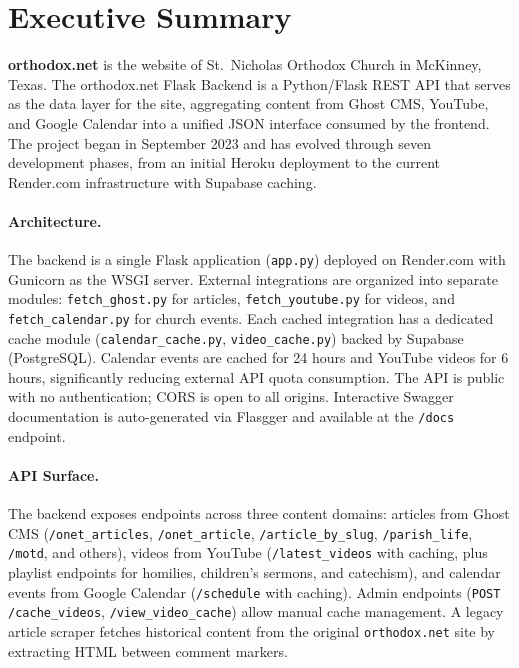 \documentclass[12pt]{article}
\begin{document}
\section{Executive Summary}
{\setlength{\parskip}{0pt}\setlength{\parfillskip}{0pt plus 1fil}%
%

\textbf{orthodox.net} is the website of St.\ Nicholas Orthodox Church in McKinney, Texas. The orthodox.net Flask Backend is a Python/Flask REST API that serves as the data layer for the site, aggregating content from Ghost CMS, YouTube, and Google Calendar into a unified JSON interface consumed by the frontend. The project began in September 2023 and has evolved through seven development phases, from an initial Heroku deployment to the current Render.com infrastructure with Supabase caching.

\paragraph{Architecture.} The backend is a single Flask application (\texttt{app.py}) deployed on Render.com with Gunicorn as the WSGI server. External integrations are organized into separate modules: \texttt{fetch\_ghost.py} for articles, \texttt{fetch\_youtube.py} for videos, and \texttt{fetch\_calendar.py} for church events. Each cached integration has a dedicated cache module (\texttt{calendar\_cache.py}, \texttt{video\_cache.py}) backed by Supabase (PostgreSQL). Calendar events are cached for 24 hours and YouTube videos for 6 hours, significantly reducing external API quota consumption. The API is public with no authentication; CORS is open to all origins. Interactive Swagger documentation is auto-generated via Flasgger and available at the \texttt{/docs} endpoint.

\paragraph{API Surface.} The backend exposes endpoints across three content domains: articles from Ghost CMS (\texttt{/onet\_articles}, \texttt{/onet\_article}, \texttt{/article\_by\_slug}, \texttt{/parish\_life}, \texttt{/motd}, and others), videos from YouTube (\texttt{/latest\_videos} with caching, plus playlist endpoints for homilies, children's sermons, and catechism), and calendar events from Google Calendar (\texttt{/schedule} with caching). Admin endpoints (\texttt{POST /cache\_videos}, \texttt{/view\_video\_cache}) allow manual cache management. A legacy article scraper fetches historical content from the original \texttt{orthodox.net} site by extracting HTML between comment markers.

}
\end{document}
